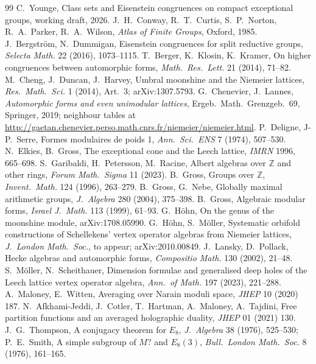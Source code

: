 \documentclass[11pt]{amsart}
\theoremstyle{definition}
\newcommand{\Z}{\mathbb{Z}}\newcommand{\Q}{\mathbb{Q}}\newcommand{\R}{\mathbb{R}}\newcommand{\A}{\mathbb{A}}\newcommand{\F}{\mathbb{F}}
\begin{document}
\begin{thebibliography}{99}
 C.~Younge, Class sets and Eisenstein congruences on compact exceptional groups, working draft, 2026.
 J.~H.~Conway, R.~T.~Curtis, S.~P.~Norton, R.~A.~Parker, R.~A.~Wilson, \emph{Atlas of Finite Groups}, Oxford, 1985.
 J.~Bergstr\"om, N.~Dummigan, Eisenstein congruences for split reductive groups, \emph{Selecta Math.} 22 (2016), 1073--1115.
 T.~Berger, K.~Klosin, K.~Kramer, On higher congruences between automorphic forms, \emph{Math.\ Res.\ Lett.} 21 (2014), 71--82.
 M.~Cheng, J.~Duncan, J.~Harvey, Umbral moonshine and the Niemeier lattices, \emph{Res.\ Math.\ Sci.} 1 (2014), Art.\ 3; arXiv:1307.5793.
 G.~Chenevier, J.~Lannes, \emph{Automorphic forms and even unimodular lattices}, Ergeb.\ Math.\ Grenzgeb.\ 69, Springer, 2019; neighbour tables at \url{http://gaetan.chenevier.perso.math.cnrs.fr/niemeier/niemeier.html}.
 P.~Deligne, J-P.~Serre, Formes modulaires de poids 1, \emph{Ann.\ Sci.\ ENS} 7 (1974), 507--530.
 N.~Elkies, B.~Gross, The exceptional cone and the Leech lattice, \emph{IMRN} 1996, 665--698.
 S.~Garibaldi, H.~Petersson, M.~Racine, Albert algebras over $\Z$ and other rings, \emph{Forum Math.\ Sigma} 11 (2023).
 B.~Gross, Groups over $\Z$, \emph{Invent.\ Math.} 124 (1996), 263--279.
 B.~Gross, G.~Nebe, Globally maximal arithmetic groups, \emph{J.\ Algebra} 280 (2004), 375--398.
 B.~Gross, Algebraic modular forms, \emph{Israel J.\ Math.} 113 (1999), 61--93.
 G.~H\"ohn, On the genus of the moonshine module, arXiv:1708.05990.
 G.~H\"ohn, S.~M\"oller, Systematic orbifold constructions of Schellekens' vertex operator algebras from Niemeier lattices, \emph{J.\ London Math.\ Soc.}, to appear; arXiv:2010.00849.
 J.~Lansky, D.~Pollack, Hecke algebras and automorphic forms, \emph{Compositio Math.} 130 (2002), 21--48.
 S.~M\"oller, N.~Scheithauer, Dimension formulae and generalised deep holes of the Leech lattice vertex operator algebra, \emph{Ann.\ of Math.} 197 (2023), 221--288.
 A.~Maloney, E.~Witten, Averaging over Narain moduli space, \emph{JHEP} 10 (2020) 187.
 N.~Afkhami-Jeddi, J.~Cotler, T.~Hartman, A.~Maloney, A.~Tajdini, Free partition functions and an averaged holographic duality, \emph{JHEP} 01 (2021) 130.
 J.~G.~Thompson, A conjugacy theorem for $E_8$, \emph{J.\ Algebra} 38 (1976), 525--530; P.~E.~Smith, A simple subgroup of $M?$ and $E_8(3)$, \emph{Bull.\ London Math.\ Soc.} 8 (1976), 161--165.

\end{thebibliography}
\end{document}
